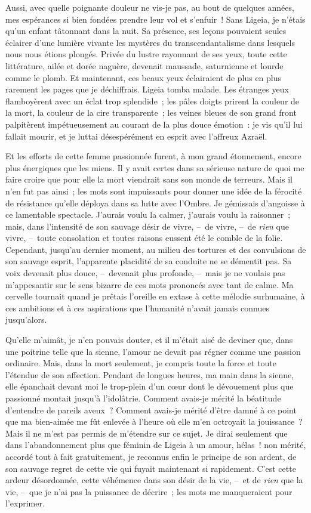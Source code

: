 \documentclass[french,twoside]{book} %
\begin{document}
Aussi, avec quelle poignante douleur ne vis-je pas, au bout de quelques années, mes espérances si bien fondées prendre leur vol et s’enfuir ! Sans Ligeia, je n’étais qu’un enfant tâtonnant dans la nuit. Sa présence, ses leçons pouvaient seules éclairer d’une lumière vivante les mystères du transcendantalisme dans lesquels nous nous étions plongés. Privée du lustre rayonnant de ses yeux, toute cette littérature, ailée et dorée naguère, devenait maussade, saturnienne et lourde comme le plomb. Et maintenant, ces beaux yeux éclairaient de plus en plus rarement les pages que je déchiffrais. Ligeia tomba malade. Les étranges yeux flamboyèrent avec un éclat trop splendide ; les pâles doigts prirent la couleur de la mort, la couleur de la cire transparente ; les veines bleues de son grand front palpitèrent impétueusement au courant de la plus douce émotion : je vis qu’il lui fallait mourir, et je luttai désespérément en esprit avec l’affreux Azraël.\par
Et les efforts de cette femme passionnée furent, à mon grand étonnement, encore plus énergiques que les miens. Il y avait certes dans sa sérieuse nature de quoi me faire croire que pour elle la mort viendrait sans son monde de terreurs. Mais il n’en fut pas ainsi ; les mots sont impuissants pour donner une idée de la férocité de résistance qu’elle déploya dans sa lutte avec l’Ombre. Je gémissais d’angoisse à ce lamentable spectacle. J’aurais voulu la calmer, j’aurais voulu la raisonner ; mais, dans l’intensité de son sauvage désir de vivre, – de vivre, – de \emph{rien} que vivre, – toute consolation et toutes raisons eussent été le comble de la folie. Cependant, jusqu’au dernier moment, au milieu des tortures et des convulsions de son sauvage esprit, l’apparente placidité de sa conduite ne se démentit pas. Sa voix devenait plus douce, – devenait plus profonde, – mais je ne voulais pas m’appesantir sur le sens bizarre de ces mots prononcés avec tant de calme. Ma cervelle tournait quand je prêtais l’oreille en extase à cette mélodie surhumaine, à ces ambitions et à ces aspirations que l’humanité n’avait jamais connues jusqu’alors.\par
Qu’elle m’aimât, je n’en pouvais douter, et il m’était aisé de deviner que, dans une poitrine telle que la sienne, l’amour ne devait pas régner comme une passion ordinaire. Mais, dans la mort seulement, je compris toute la force et toute l’étendue de son affection. Pendant de longues heures, ma main dans la sienne, elle épanchait devant moi le trop-plein d’un cœur dont le dévouement plus que passionné montait jusqu’à l’idolâtrie. Comment avais-je mérité la béatitude d’entendre de pareils aveux ? Comment avais-je mérité d’être damné à ce point que ma bien-aimée me fût enlevée à l’heure où elle m’en octroyait la jouissance ? Mais il ne m’est pas permis de m’étendre sur ce sujet. Je dirai seulement que dans l’abandonnement plus que féminin de Ligeia à un amour, hélas ! non mérité, accordé tout à fait gratuitement, je reconnus enfin le principe de son ardent, de son sauvage regret de cette vie qui fuyait maintenant si rapidement. C’est cette ardeur désordonnée, cette véhémence dans son désir de la vie, – et de \emph{rien} que la vie, – que je n’ai pas la puissance de décrire ; les mots me manqueraient pour l’exprimer.\par
\end{document}
